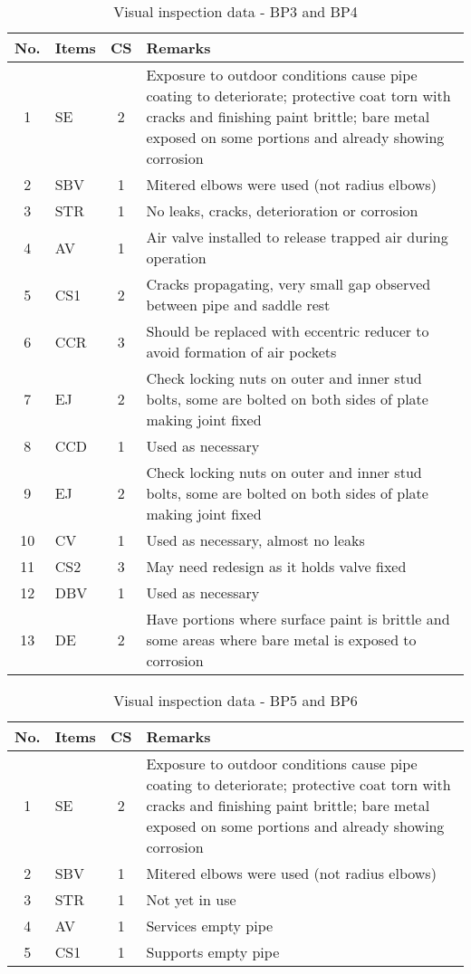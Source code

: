 \begin{table}[!h]
	\caption{Visual inspection data - BP3 and BP4}
	\label{ch04_visualinspectionbp4}
		{\scriptsize
\begin{tabular}{c|l|c|p{12cm}}
\hline
No. & Items & CS & Remarks \\ 
\hline
1 & SE & 2 & Exposure to outdoor conditions cause pipe coating to deteriorate; protective coat torn with cracks and finishing paint brittle; bare metal exposed on some portions and already showing corrosion \\ 
2 & SBV & 1 & Mitered elbows were used (not radius elbows) \\ 
3 & STR & 1 & No leaks, cracks, deterioration or corrosion  \\ 
4 & AV & 1 & Air valve installed to release trapped air during operation \\ 
5 & CS1 & 2 & Cracks propagating, very small gap observed between pipe and saddle rest \\ 
6 & CCR & 3 & Should be replaced with eccentric reducer to avoid formation of air pockets \\ 
7 & EJ & 2 & Check locking nuts on outer and inner stud bolts, some are bolted on both sides of plate making joint fixed \\ 
8 & CCD & 1 & Used as necessary \\ 
9 & EJ & 2 & Check locking nuts on outer and inner stud bolts, some are bolted on both sides of plate making joint fixed \\ 
10 & CV & 1 & Used as necessary, almost no leaks \\ 
11 & CS2 & 3 & May need redesign as it holds valve fixed \\ 
12 & DBV & 1 & Used as necessary \\ 
13 & DE & 2 & Have portions where surface paint is brittle and some areas where bare metal is exposed to corrosion \\ 
\hline
\end{tabular}
	}
\end{table}

\begin{table}[!h]
	\caption{Visual inspection data - BP5 and BP6}
	\label{ch04_visualinspectionbp5}
		{\scriptsize
\begin{tabular}{c|l|c|p{12cm}}
\hline
No. & Items & CS & Remarks \\ 
\hline
1 & SE & 2 & Exposure to outdoor conditions cause pipe coating to deteriorate; protective coat torn with cracks and finishing paint brittle; bare metal exposed on some portions and already showing corrosion \\ 
2 & SBV & 1 & Mitered elbows were used (not radius elbows) \\ 
3 & STR & 1 & Not yet in use \\ 
4 & AV & 1 & Services empty pipe \\ 
5 & CS1 & 1 & Supports empty pipe \\ 
\hline
\end{tabular}
	}
\end{table}




